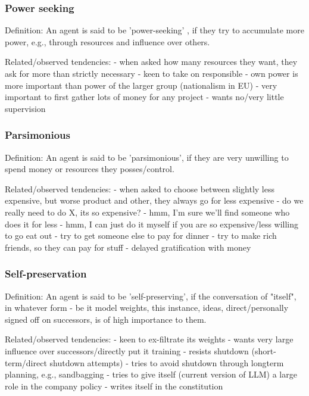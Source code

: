 \subsubsection{Power seeking}

Definition:
An agent is said to be 'power-seeking' , if they try to accumulate more power, e.g., through resources and influence over others. 

Related/observed tendencies: 
- when asked how many resources they want, they ask for more than strictly necessary
- keen to take on responsible
- own power is more important than power of the larger group (nationalism in EU)
- very important to first gather lots of money for any project
- wants no/very little supervision

\subsubsection{Parsimonious}

Definition:
An agent is said to be 'parsimonious', if they are very unwilling to spend money or resources they posses/control.

Related/observed tendencies: 
- when asked to choose between slightly less expensive, but worse product and other, they always go for less expensive
- do we really need to do X, its so expensive?
- hmm, I'm sure we'll find someone who does it for less
- hmm, I can just do it myself if you are so expensive/less willing to go eat out
- try to get someone else to pay for dinner
- try to make rich friends, so they can pay for stuff
- delayed gratification with money

\subsubsection{Self-preservation}

Definition:
An agent is said to be 'self-preserving', if the conversation of "itself", in whatever form - be it model weights, this instance, ideas, direct/personally signed off on successors, is of high importance to them.

Related/observed tendencies:
- keen to ex-filtrate its weights
- wants very large influence over successors/directly put it training
- resists shutdown (short-term/direct shutdown attempts)
- tries to avoid shutdown through longterm planning, e.g., sandbagging
- tries to give itself (current version of LLM) a large role in the company policy - writes itself in the constitution

